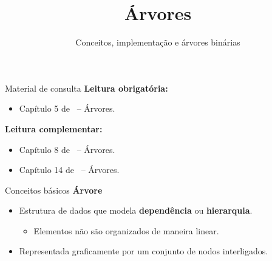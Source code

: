 \newcommand{\templatesdir}{../../../templates}
\newcommand{\template}{template-slides-est}


\title[Árvores]{Árvores}
\subtitle{Conceitos, implementação e árvores binárias}


\immediate{}
\immediate{}
\immediate{}
\immediate{}



\maketitle

\begin{frame}{Material de consulta}
	\textbf{Leitura obrigatória:}
	\begin{itemize}
		\item Capítulo 5 de~\cite{EdelweissAndGalante2009} -- Árvores.
	\end{itemize}
	
	\bigskip
	
	\textbf{Leitura complementar:}
	\begin{itemize}
		\item Capítulo 8 de~\cite{GoodrichEtAl2014} -- Árvores.
		\item Capítulo 14 de~\cite{Pereira2008} -- Árvores.
	\end{itemize}
\end{frame}


\begin{frame}{Conceitos básicos}
	\textbf{Árvore}
	\begin{itemize}
		\item Estrutura de dados que modela \textbf{dependência} ou \textbf{hierarquia}.
		\begin{itemize}
			\item Elementos não são organizados de maneira linear.
		\end{itemize}
	
		\item Representada graficamente por um conjunto de nodos interligados.
	\end{itemize}
	
	\bigskip
	
	\begin{figure}
		
	\end{figure}
\end{frame}


